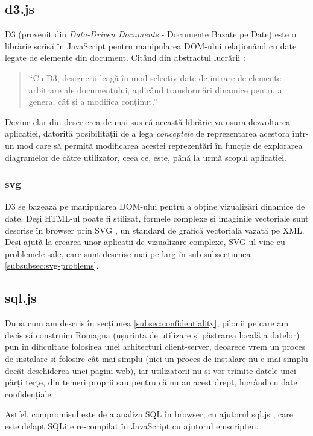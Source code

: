 \documentclass[12pt, a4paper, twoside, romanian]{teza-upb}
\begin{document}
    \subsection{d3.js}
      D3 (provenit din \textit{Data-Driven Documents} - Documente Bazate pe Date) este o librărie scrisă în JavaScript pentru manipularea DOM-ului relaționând cu date legate de elemente din document. Citând din abstractul lucrării \cite{bostock:2011:d3}:
      \begin{quote}
        ``Cu D3, designerii leagă în mod selectiv date de intrare de elemente arbitrare ale documentului, aplicând transformări dinamice pentru a genera, cât și a modifica conținut.''
      \end{quote}
      Devine clar din descrierea de mai sus că această librărie va ușura dezvoltarea aplicației, datorită posibilității de a lega \textit{conceptele} de reprezentarea acestora într-un mod care să permită modificarea acestei reprezentări în funcție de explorarea diagramelor de către utilizator, ceea ce, este, până la urmă scopul aplicației.
      \subsubsection{svg}
        D3 se bazează pe manipularea DOM-ului pentru a obține vizualizări dinamice de date. Deși HTML-ul poate fi stilizat, formele complexe și imaginile vectoriale sunt descrise în browser prin SVG \cite{Ferraiolo:01:SVG}, un standard de grafică vectorială vazată pe XML. Deși ajută la crearea unor aplicații de vizualizare complexe, SVG-ul vine cu problemele sale, care sunt descrise mai pe larg în sub-subsecțiunea \ref{subsubsec:svg-problems}.
    \subsection{sql.js}
      După cum am descris în secțiunea \ref{subsec:confidentiality}, pilonii pe care am decis să construim Romagna (ușurința de utilizare și păstrarea locală a datelor) pun în dificultate folosirea unei arhitecturi client-server, deoarece vrem un proces de instalare și folosire cât mai simplu (nici un proces de instalare nu e mai simplu decât deschiderea unei pagini web), iar utilizatorii nu-și vor trimite datele unei părți terțe, din temeri proprii sau pentru că nu au acest drept, lucrând cu date confidențiale.

      Astfel, compromisul este de a analiza SQL în browser, cu ajutorul sql.js \cite{sqljs:homepage}, care este defapt SQLite re-compilat în JavaScript cu ajutorul emscripten.
\end{document}
